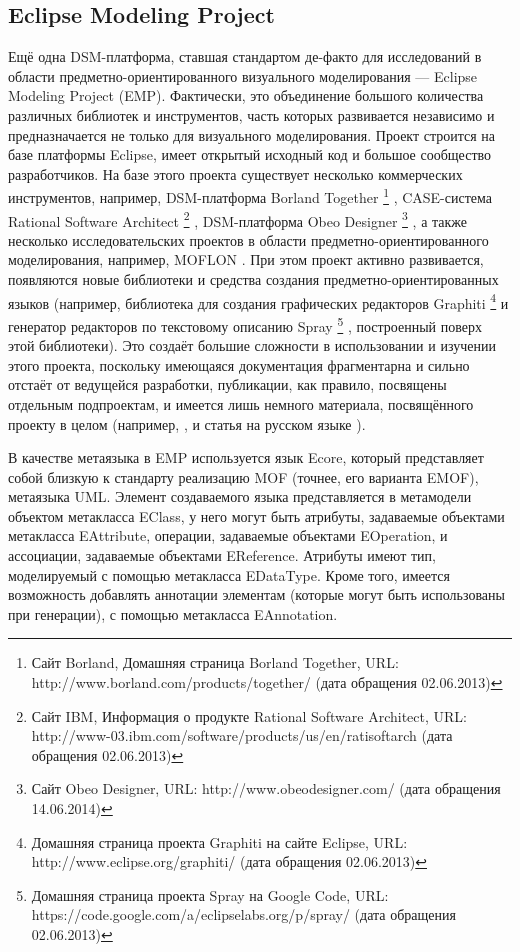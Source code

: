 \subsection{Eclipse Modeling Project}
Ещё одна DSM-платформа, ставшая стандартом де-факто для исследований в области предметно-ориентированного визуального моделирования --- 
Eclipse Modeling Project (EMP). Фактически, это объединение большого количества различных библиотек и инструментов, часть которых развивается 
независимо и предназначается не только для визуального моделирования. Проект строится на базе платформы 
Eclipse, имеет открытый исходный код и большое сообщество разработчиков. На базе этого 
проекта существует несколько коммерческих инструментов, например, DSM-платформа Borland Together
\footnote{Сайт Borland, Домашняя страница Borland Together, URL: http://www.borland.com/products/together/ (дата обращения 02.06.2013)}
, CASE-система Rational Software Architect
\footnote{Сайт IBM, Информация о продукте Rational Software Architect, 
URL: http://www-03.ibm.com/software/products/us/en/ratisoftarch (дата обращения 02.06.2013)}
, DSM-платформа Obeo Designer
\footnote{Сайт Obeo Designer, URL: http://www.obeodesigner.com/ (дата обращения 14.06.2014)}
, а также несколько исследовательских проектов в области предметно-ориентированного моделирования, например, MOFLON
. При этом проект активно развивается, появляются новые библиотеки и средства создания предметно-ориентированных 
языков (например, библиотека для создания графических редакторов Graphiti 
\footnote{Домашняя страница проекта Graphiti на сайте Eclipse, URL: http://www.eclipse.org/graphiti/ (дата обращения 02.06.2013)}
и генератор редакторов по текстовому описанию Spray
\footnote{Домашняя страница проекта Spray на Google Code, URL: https://code.google.com/a/eclipselabs.org/p/spray/ (дата обращения 02.06.2013)}
, построенный поверх этой библиотеки). Это создаёт большие сложности в использовании и изучении этого проекта, поскольку имеющаяся документация 
фрагментарна и сильно отстаёт от ведущейся разработки, публикации, как правило, посвящены 
отдельным подпроектам, и имеется лишь немного материала, посвящённого проекту в целом 
(например, \cite{gronback2009eclipse}, и статья на русском языке \cite{sorokin2010obzor}).

В качестве метаязыка в EMP используется язык Ecore, который представляет собой близкую 
к стандарту реализацию MOF (точнее, его варианта EMOF), метаязыка UML. Элемент создаваемого 
языка представляется в метамодели объектом метакласса EClass, у него могут быть атрибуты, 
задаваемые объектами метакласса EAttribute, операции, задаваемые объектами EOperation, и 
ассоциации, задаваемые объектами EReference. Атрибуты имеют тип, моделируемый с помощью 
метакласса EDataType. Кроме того, имеется возможность добавлять аннотации элементам 
(которые могут быть использованы при генерации), с помощью метакласса EAnnotation.

